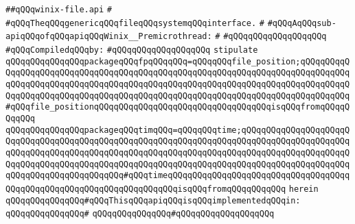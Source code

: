 \label{src/lib/std/src/winix/winix-file.api}
\verb|##qQQqwinix-file.api|\newline
\verb|#|\newline
\verb|#qQQqTheqQQqgenericqQQqfileqQQqsystemqQQqinterface.|\newline
\verb|#|\newline
\verb|#qQQqAqQQqsub-apiqQQqofqQQqapiqQQqWinix__Premicrothread:|\newline
\verb|#|\newline
\verb|#qQQqqQQqqQQqqQQqqQQq|\newline
\newline
\verb|#qQQqCompiledqQQqby:|\newline
\verb|#qQQqqQQqqQQqqQQqqQQq|\newline
\newline
\newline
\verb|stipulate|\newline
\verb|qQQqqQQqqQQqqQQqpackageqQQqfpqQQqqQQq=qQQqqQQqfile_position;qQQqqQQqqQQqqQQqqQQqqQQqqQQqqQQqqQQqqQQqqQQqqQQqqQQqqQQqqQQqqQQqqQQqqQQqqQQqqQQqqQQqqQQqqQQqqQQqqQQqqQQqqQQqqQQqqQQqqQQqqQQqqQQqqQQqqQQqqQQqqQQqqQQqqQQqqQQqqQQqqQQqqQQqqQQqqQQqqQQqqQQqqQQqqQQqqQQqqQQqqQQqqQQqqQQqqQQqqQQq#qQQqfile_positionqQQqqQQqqQQqqQQqqQQqqQQqqQQqqQQqqQQqisqQQqfromqQQqqQQqqQQq|\newline
\verb|qQQqqQQqqQQqqQQqpackageqQQqtimqQQq=qQQqqQQqtime;qQQqqQQqqQQqqQQqqQQqqQQqqQQqqQQqqQQqqQQqqQQqqQQqqQQqqQQqqQQqqQQqqQQqqQQqqQQqqQQqqQQqqQQqqQQqqQQqqQQqqQQqqQQqqQQqqQQqqQQqqQQqqQQqqQQqqQQqqQQqqQQqqQQqqQQqqQQqqQQqqQQqqQQqqQQqqQQqqQQqqQQqqQQqqQQqqQQqqQQqqQQqqQQqqQQqqQQqqQQqqQQqqQQqqQQqqQQqqQQqqQQqqQQqqQQqqQQq#qQQqtimeqQQqqQQqqQQqqQQqqQQqqQQqqQQqqQQqqQQqqQQqqQQqqQQqqQQqqQQqqQQqqQQqqQQqqQQqisqQQqfromqQQqqQQqqQQq|\newline
\verb|herein|\newline
\newline
\verb|qQQqqQQqqQQqqQQq#qQQqThisqQQqapiqQQqisqQQqimplementedqQQqin:|\newline
\verb|qQQqqQQqqQQqqQQq#|\newline
\verb|qQQqqQQqqQQqqQQq#qQQqqQQqqQQqqQQqqQQq|\newline
